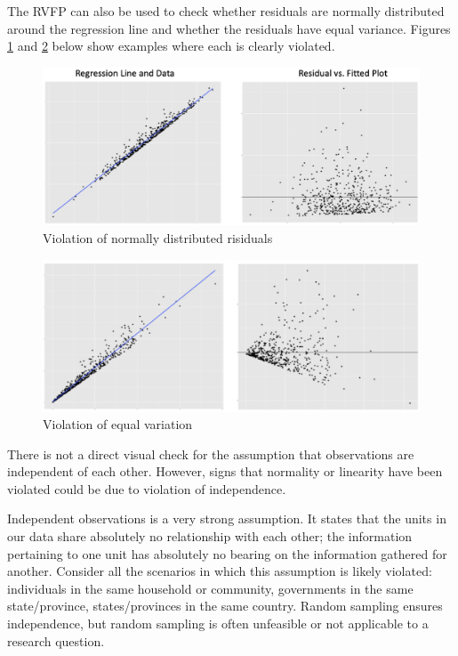 \documentclass[
]{book}
\begin{document}
The RVFP can also be used to check whether residuals are normally distributed around the regression line and whether the residuals have equal variance. Figures \ref{fig:rvfpnormal} and \ref{fig:rvfpequal} below show examples where each is clearly violated.

\begin{figure}
\includegraphics[width=14.53in]{images/rvfp_normal} \caption{Violation of normally distributed risiduals}\label{fig:rvfpnormal}
\end{figure}

\begin{figure}
\includegraphics[width=14.19in]{images/rvfp_equal} \caption{Violation of equal variation}\label{fig:rvfpequal}
\end{figure}

There is not a direct visual check for the assumption that observations are independent of each other. However, signs that normality or linearity have been violated could be due to violation of independence.

Independent observations is a very strong assumption. It states that the units in our data share absolutely no relationship with each other; the information pertaining to one unit has absolutely no bearing on the information gathered for another. Consider all the scenarios in which this assumption is likely violated: individuals in the same household or community, governments in the same state/province, states/provinces in the same country. Random sampling ensures independence, but random sampling is often unfeasible or not applicable to a research question.
\end{document}
